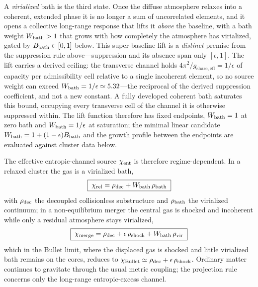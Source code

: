 \documentclass[11pt]{article}
\begin{document}
A \emph{virialized} bath is the third state. Once the diffuse atmosphere relaxes into a coherent, extended phase it is no longer a sum of uncorrelated elements, and it opens a collective long-range response that lifts it \emph{above} the baseline, with a bath weight $W_{\rm bath}>1$ that grows with how completely the atmosphere has virialized, gated by $B_{\rm bath}\in[0,1]$ below. This super-baseline lift is a \emph{distinct} premise from the suppression rule above---suppression and its absence span only $[\epsilon,1]$. The lift carries a derived ceiling: the transverse channel holds $4\pi^2/g_{\mathrm{share,eff}}=1/\epsilon$ of capacity per admissibility cell relative to a single incoherent element, so no source weight can exceed $W_{\rm bath}=1/\epsilon\simeq5.32$---the reciprocal of the derived suppression coefficient, and not a new constant. A fully developed coherent bath saturates this bound, occupying every transverse cell of the channel it is otherwise suppressed within. The lift function therefore has fixed endpoints, $W_{\rm bath}=1$ at zero bath and $W_{\rm bath}=1/\epsilon$ at saturation; the minimal linear candidate $W_{\rm bath}=1+(1-\epsilon)B_{\rm bath}$ and the growth profile between the endpoints are evaluated against cluster data below.

The effective entropic-channel source $\chi_{\rm ent}$ is therefore regime-dependent. In a relaxed cluster the gas is a virialized bath,
\[
\boxed{\;
\chi_{\rm rel}=\rho_{\rm dec}+W_{\rm bath}\,\rho_{\rm bath}\;}
\]
with $\rho_{\rm dec}$ the decoupled collisionless substructure and $\rho_{\rm bath}$ the virialized continuum; in a non-equilibrium merger the central gas is shocked and incoherent while only a residual atmosphere stays virialized,
\[
\boxed{\;
\chi_{\rm merge}=\rho_{\rm dec}+\epsilon\,\rho_{\rm shock}+W_{\rm bath}\,\rho_{\rm vir}\;}
\]
which in the Bullet limit, where the displaced gas is shocked and little virialized bath remains on the cores, reduces to $\chi_{\rm Bullet}\simeq\rho_{\rm dec}+\epsilon\,\rho_{\rm shock}$. Ordinary matter continues to gravitate through the usual metric coupling; the projection rule concerns only the long-range entropic-excess channel.
\end{document}
